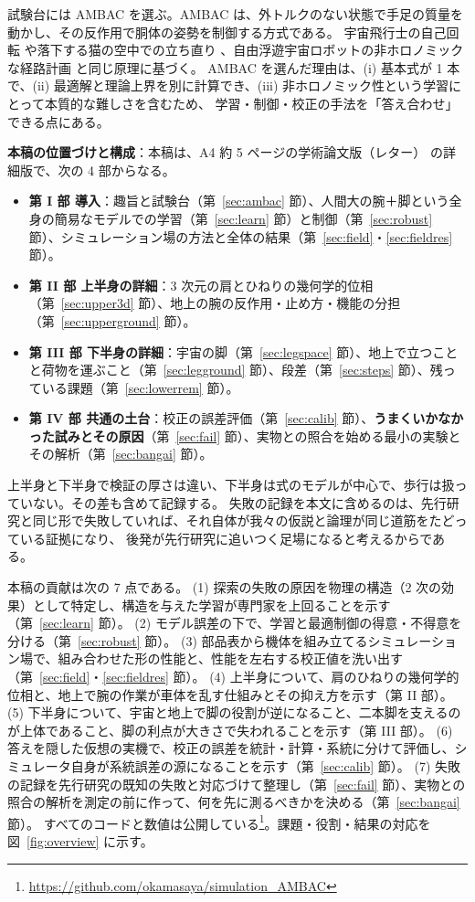 \documentclass[paper=a4paper,fontsize=10pt,twocolumn,column_gap=2zw,line_length=24zw,number_of_lines=46,head_space=20mm]{jlreq}
\newcommand{\repo}{https://github.com/okamasaya/simulation_AMBAC}
\begin{document}
試験台には AMBAC を選ぶ。AMBAC は、外トルクのない状態で手足の質量を動かし、その反作用で胴体の姿勢を制御する方式である。
宇宙飛行士の自己回転 \cite{kane1970} や落下する猫の空中での立ち直り \cite{kane1969,montgomery1993}、自由浮遊宇宙ロボットの非ホロノミックな経路計画 \cite{nakamura1991} と同じ原理に基づく。
AMBAC を選んだ理由は、(i) 基本式が 1 本で、(ii) 最適解と理論上界を別に計算でき、(iii) 非ホロノミック性という学習にとって本質的な難しさを含むため、
学習・制御・校正の手法を「答え合わせ」できる点にある。

\textbf{本稿の位置づけと構成}：本稿は、A4 約 5 ページの学術論文版（レター）\cite{letter2026} の詳細版で、次の 4 部からなる。
\begin{itemize}\setlength{\itemsep}{0pt}
\item \textbf{第 I 部 導入}：趣旨と試験台（第~\ref{sec:ambac} 節）、人間大の腕＋脚という全身の簡易なモデルでの学習（第~\ref{sec:learn} 節）と制御（第~\ref{sec:robust} 節）、シミュレーション場の方法と全体の結果（第~\ref{sec:field}・\ref{sec:fieldres} 節）。
\item \textbf{第 II 部 上半身の詳細}：3 次元の肩とひねりの幾何学的位相（第~\ref{sec:upper3d} 節）、地上の腕の反作用・止め方・機能の分担（第~\ref{sec:upperground} 節）。
\item \textbf{第 III 部 下半身の詳細}：宇宙の脚（第~\ref{sec:legspace} 節）、地上で立つことと荷物を運ぶこと（第~\ref{sec:legground} 節）、段差（第~\ref{sec:steps} 節）、残っている課題（第~\ref{sec:lowerrem} 節）。
\item \textbf{第 IV 部 共通の土台}：校正の誤差評価（第~\ref{sec:calib} 節）、\textbf{うまくいかなかった試みとその原因}（第~\ref{sec:fail} 節）、実物との照合を始める最小の実験とその解析（第~\ref{sec:bangai} 節）。
\end{itemize}
上半身と下半身で検証の厚さは違い、下半身は式のモデルが中心で、歩行は扱っていない。その差も含めて記録する。
失敗の記録を本文に含めるのは、先行研究と同じ形で失敗していれば、それ自体が我々の仮説と論理が同じ道筋をたどっている証拠になり、
後発が先行研究に追いつく足場になると考えるからである。

本稿の貢献は次の 7 点である。
(1) 探索の失敗の原因を物理の構造（2 次の効果）として特定し、構造を与えた学習が専門家を上回ることを示す（第~\ref{sec:learn} 節）。
(2) モデル誤差の下で、学習と最適制御の得意・不得意を分ける（第~\ref{sec:robust} 節）。
(3) 部品表から機体を組み立てるシミュレーション場で、組み合わせた形の性能と、性能を左右する校正値を洗い出す（第~\ref{sec:field}・\ref{sec:fieldres} 節）。
(4) 上半身について、肩のひねりの幾何学的位相と、地上で腕の作業が車体を乱す仕組みとその抑え方を示す（第 II 部）。
(5) 下半身について、宇宙と地上で脚の役割が逆になること、二本脚を支えるのが上体であること、脚の利点が大きさで失われることを示す（第 III 部）。
(6) 答えを隠した仮想の実機で、校正の誤差を統計・計算・系統に分けて評価し、シミュレータ自身が系統誤差の源になることを示す（第~\ref{sec:calib} 節）。
(7) 失敗の記録を先行研究の既知の失敗と対応づけて整理し（第~\ref{sec:fail} 節）、実物との照合の解析を測定の前に作って、何を先に測るべきかを決める（第~\ref{sec:bangai} 節）。
すべてのコードと数値は公開している\footnote{\url{\repo}}。課題・役割・結果の対応を図~\ref{fig:overview} に示す。
\end{document}
